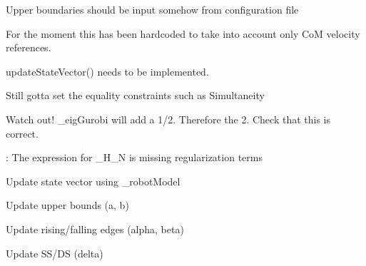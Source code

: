 
\begin{DoxyRefList}
\item[\label{todo__todo000003}%
\hypertarget{todo__todo000003}{}%
\-Member \hyperlink{classConstancy_ae38922343ad8a98bd4e501e8ada5c83c}{\-Constancy\-:\-:\-Constancy} ()]\-Upper boundaries should be input somehow from configuration file  
\item[\label{todo__todo000009}%
\hypertarget{todo__todo000009}{}%
\-Member \hyperlink{classMIQPController_ada92fc35065a11b889019f2948c1888d}{\-M\-I\-Q\-P\-Controller\-:\-:\-\_\-\-Sw} ]\-For the moment this has been hardcoded to take into account only \-Co\-M velocity references.  
\item[\label{todo__todo000007}%
\hypertarget{todo__todo000007}{}%
\-Member \hyperlink{classMIQPController_aa8fd8452a14d8e7731bf45044e1c7a59}{\-M\-I\-Q\-P\-Controller\-:\-:run} ()]update\-State\-Vector() needs to be implemented. 

\-Still gotta set the equality constraints such as \-Simultaneity 

\-Watch out! \-\_\-eig\-Gurobi will add a 1/2. \-Therefore the 2. \-Check that this is correct. 

\-: \-The expression for \-\_\-\-H\-\_\-\-N is missing regularization terms  
\item[\label{todo__todo000008}%
\hypertarget{todo__todo000008}{}%
\-Member \hyperlink{classMIQPController_a8320465a1ec80d0cf7ba0d17652feba5}{\-M\-I\-Q\-P\-Controller\-:\-:update\-State\-Vector} ()]\-Update state vector using \-\_\-robot\-Model 

\-Update upper bounds (a, b) 

\-Update rising/falling edges (alpha, beta) 

\-Update \-S\-S/\-D\-S (delta) 


\end{DoxyRefList}
